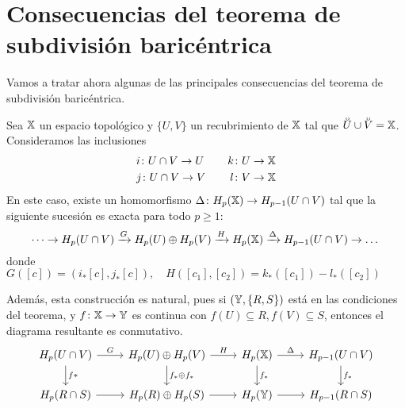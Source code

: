 \section{Consecuencias del teorema de subdivisión baricéntrica}

Vamos a tratar ahora algunas de las principales consecuencias del teorema de subdivisión baricéntrica.

\begin{theorem}
  Sea ${\mathbb X}$ un espacio topológico y $\{U, V\}$ un recubrimiento de ${\mathbb X}$ tal que $\interior{U} \cup \interior{V} = \X$. Consideramos las inclusiones
  \begin{align*}
    & i \colon U \cap V \to U &\quad k \colon U \to {\mathbb X} \\
    & j \colon U \cap V \to V &\quad l \colon V \to {\mathbb X}
  \end{align*}
  En este caso, existe un homomorfismo $\Delta \colon H_p({\mathbb X}) \to H_{p-1}(U \cap V)$ tal que la siguiente sucesión es exacta para todo $p \geq 1$:
  \[ \dots \to H_p(U \cap V) \xrightarrow{G} H_p(U) \oplus H_p(V) \xrightarrow{H} H_p({\mathbb X}) \xrightarrow{\Delta} H_{p-1}(U \cap V) \to \dots \]
  donde $G([c]) = (i_*[c], j_*[c]), \quad H([c_1], [c_2]) = k_*([c_1]) - l_*([c_2])$

  Además, esta construcción es natural, pues si $({\mathbb Y}, \{R, S\})$ está en las condiciones del teorema, y $f \colon {\mathbb X} \to {\mathbb Y}$ es continua con
  $f(U) \subseteq R, f(V) \subseteq S$, entonces el diagrama resultante es conmutativo.
  \[ \begin{tikzcd}
    H_p(U \cap V) \arrow{r}{G} \arrow{d}{f*} & H_p(U) \oplus H_p(V) \arrow{r}{H} \arrow{d}{f_*  \oplus f_*} & H_p(\X) \arrow{r}{\Delta} \arrow{d}{f_*} & H_{p-1}(U \cap V) \arrow{d}{f_*} \\
    H_p(R \cap S) \arrow{r}  & H_p(R) \oplus H_p(S) \arrow{r} & H_p(\Y) \arrow{r} & H_{p-1}(R \cap S)
  \end{tikzcd} \]

\end{theorem}


